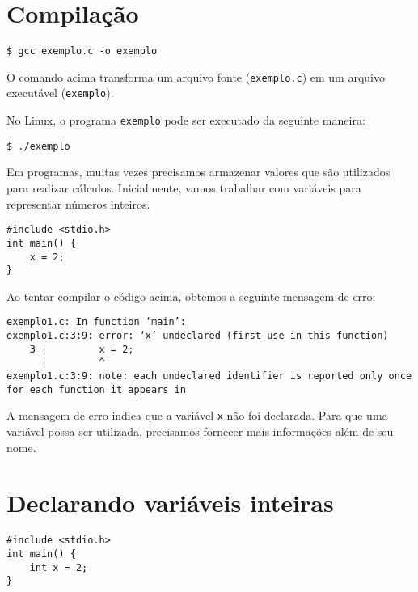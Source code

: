 \documentclass[a4paper,11pt]{article}
\begin{document}
\section*{Compilação}

\begin{verbatim}
$ gcc exemplo.c -o exemplo
\end{verbatim}

O comando acima transforma um arquivo fonte (\texttt{exemplo.c}) em um arquivo executável (\texttt{exemplo}).

No Linux, o programa \texttt{exemplo} pode ser executado da seguinte maneira:

\begin{verbatim}
$ ./exemplo
\end{verbatim}

Em programas, muitas vezes precisamos armazenar valores que são utilizados para realizar cálculos. Inicialmente, vamos trabalhar com variáveis para representar números inteiros.

\begin{verbatim}
#include <stdio.h>
int main() {
    x = 2;
}
\end{verbatim}

Ao tentar compilar o código acima, obtemos a seguinte mensagem de erro:

\begin{verbatim}
exemplo1.c: In function ‘main’:
exemplo1.c:3:9: error: ‘x’ undeclared (first use in this function)
    3 |         x = 2;
      |         ^
exemplo1.c:3:9: note: each undeclared identifier is reported only once 
for each function it appears in
\end{verbatim}

A mensagem de erro indica que a variável \texttt{x} não foi declarada. Para que uma variável possa ser utilizada, precisamos fornecer mais informações além de seu nome.

\section*{Declarando variáveis inteiras}

\begin{verbatim}
#include <stdio.h>
int main() {
    int x = 2;
}
\end{verbatim}
\end{document}

